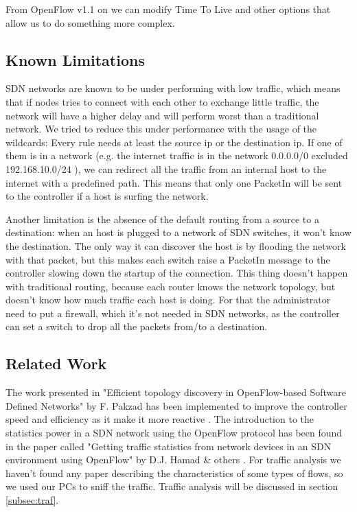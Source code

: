 \documentclass[article,10pt]{IEEEtran}
\begin{document}
From OpenFlow v1.1 on we can modify Time To Live and other options that allow us to do something more complex.

\subsection{Known Limitations}
SDN networks are known to be under performing with low traffic, which means that if nodes tries to connect with each other
to exchange little traffic, the network will have a higher delay and will perform worst than a
traditional network. We tried to reduce this under performance with the usage of the wildcards:
Every rule needs at least the source ip or the destination ip. If one of them is in a network
(e.g. the internet traffic is in the network 0.0.0.0/0 excluded 192.168.10.0/24 ),
we can redirect all the traffic from an internal host to the internet with a predefined
path. This means that only one PacketIn will be sent to the controller if a host is surfing the network.

Another limitation is the absence of the default routing from a source to a destination: when an host
is plugged to a network of SDN switches, it won't know the destination. The only way it can
discover the host is by flooding the network with that packet, but this makes each switch raise a PacketIn message to the controller
slowing down the startup of the connection. This thing doesn't happen with traditional routing, because each router knows
the network topology, but doesn't know how much traffic each host is doing. For that the administrator need to put a firewall, which it's not needed in SDN networks,
as the controller can set a switch to drop all the packets from/to a destination.


\subsection{Related Work}
  The work presented in
"Efficient topology discovery in OpenFlow-based Software Defined Networks" by F. Pakzad 
has been implemented to improve the controller speed and efficiency as it make it more reactive \cite{farzaneh}.
\newline The introduction to the statistics power in a SDN network using the OpenFlow protocol has been found
in the paper called "Getting traffic statistics from network devices in an SDN environment using OpenFlow" by D.J. Hamad \& others \cite{stat}.
\newline For traffic analysis we haven't found any paper describing the characteristics of
some types of flows, so we used our PCs to sniff the traffic. \newline 
Traffic analysis will be discussed in section \ref{subsec:traf}.
\end{document}
